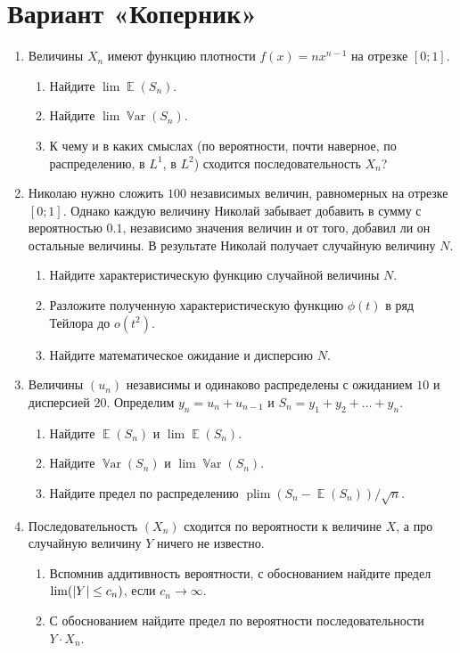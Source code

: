 \documentclass[12pt]{article}
\DeclareMathOperator{\Var}{\mathbb{V}ar}
\let\P\relax
\DeclareMathOperator{\P}{\mathbb{P}}
\DeclarePairedDelimiter{\abs}{\lvert}{\rvert}
\DeclareMathOperator{\plim}{plim}
\DeclareMathOperator{\E}{\mathbb{E}}
\begin{document}
\section*{Вариант «Коперник»}

\begin{enumerate}
    \item Величины $X_n$ имеют функцию плотности $f(x) = n x^{n-1}$ на отрезке $[0;1]$.
    \begin{enumerate}
        \item Найдите $\lim \E(S_n)$.
        \item Найдите $\lim \Var(S_n)$.
        \item К чему и в каких смыслах (по вероятности, почти наверное, по распределению, в $L^1$, в $L^2$) сходится последовательность $X_n$?
    \end{enumerate}

    \item Николаю нужно сложить $100$ независимых величин, равномерных на отрезке $[0;1]$.
    Однако каждую величину Николай забывает добавить в сумму с вероятностью $0.1$, независимо значения величин и от того, добавил ли он остальные величины. 
    В результате Николай получает случайную величину $N$.

    \begin{enumerate}
        \item Найдите характеристическую функцию случайной величины $N$.
        \item Разложите полученную характеристическую функцию $\phi(t)$ в ряд Тейлора до $o(t^2)$.
        \item Найдите математическое ожидание и дисперсию $N$.
    \end{enumerate}


    \item Величины $(u_n)$ независимы и одинаково распределены с ожиданием $10$ и дисперсией $20$.
    Определим $y_n = u_n + u_{n-1}$ и $S_n = y_1 + y_2 + \dots + y_n$.

    \begin{enumerate}
        \item Найдите $\E(S_n)$ и $\lim \E(S_n)$.
        \item Найдите $\Var(S_n)$ и $\lim \Var(S_n)$.
        \item Найдите предел по распределению $\plim (S_n - \E(S_n))/\sqrt{n}$.
    \end{enumerate}

    \item Последовательность $(X_n)$ сходится по вероятности к величине $X$, а про случайную величину $Y$ ничего не известно. 
    \begin{enumerate}
        \item Вспомнив аддитивность вероятности, с обоснованием найдите предел $\lim \P(\abs{Y} \leq c_n)$, если $c_n \to \infty$. 
        \item С обоснованием найдите предел по вероятности последовательности $Y \cdot X_n$. 
    \end{enumerate}


\end{enumerate}
\end{document}
